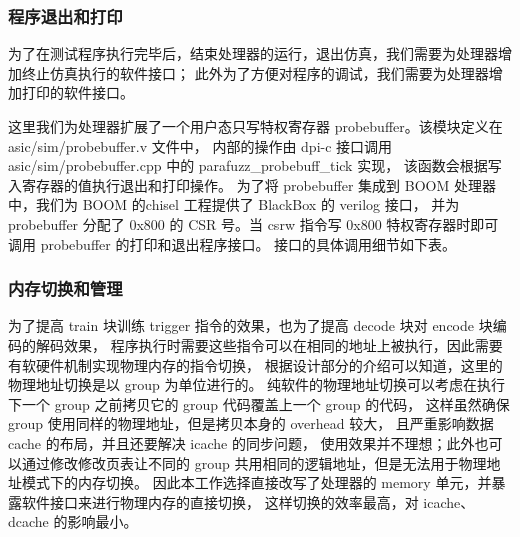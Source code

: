 \subsubsection{程序退出和打印}
为了在测试程序执行完毕后，结束处理器的运行，退出仿真，我们需要为处理器增加终止仿真执行的软件接口；
此外为了方便对程序的调试，我们需要为处理器增加打印的软件接口。\par

这里我们为处理器扩展了一个用户态只写特权寄存器 probebuffer。该模块定义在 asic/sim/probebuffer.v 文件中，
内部的操作由 dpi-c 接口调用 asic/sim/probebuffer.cpp 中的 parafuzz\_probebuff\_tick 实现，
该函数会根据写入寄存器的值执行退出和打印操作。
为了将 probebuffer 集成到 BOOM 处理器中，我们为 BOOM 的chisel 工程提供了 BlackBox 的 verilog 接口，
并为 probebuffer 分配了 0x800 的 CSR 号。当 csrw 指令写 0x800 特权寄存器时即可调用 probebuffer 的打印和退出程序接口。
接口的具体调用细节如下表。\par

\begin{table}[h!]
    \begin{center} 
    \caption{probebuffer 软件接口} 
    \label{table:probebuffer}  
    \end{center}
\end{table}

\subsubsection{内存切换和管理}
为了提高 train 块训练 trigger 指令的效果，也为了提高 decode 块对 encode 块编码的解码效果，
程序执行时需要这些指令可以在相同的地址上被执行，因此需要有软硬件机制实现物理内存的指令切换，
根据设计部分的介绍可以知道，这里的物理地址切换是以 group 为单位进行的。
纯软件的物理地址切换可以考虑在执行下一个 group 之前拷贝它的 group 代码覆盖上一个 group 的代码，
这样虽然确保 group 使用同样的物理地址，但是拷贝本身的 overhead 较大，
且严重影响数据 cache 的布局，并且还要解决 icache 的同步问题，
使用效果并不理想；此外也可以通过修改修改页表让不同的 group 共用相同的逻辑地址，但是无法用于物理地址模式下的内存切换。
因此本工作选择直接改写了处理器的 memory 单元，并暴露软件接口来进行物理内存的直接切换，
这样切换的效率最高，对 icache、dcache 的影响最小。\par

